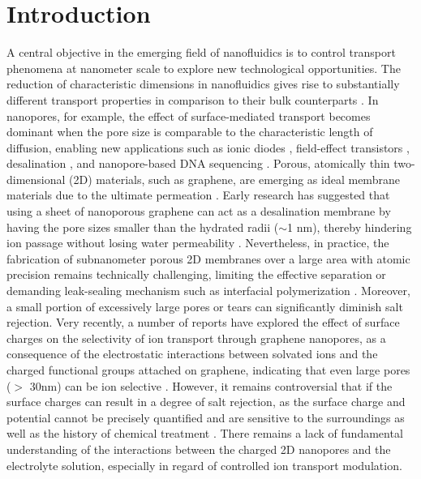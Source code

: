 \documentclass[journal=langd5,email=true, hyperref=true, keywords=false]{achemso}
\begin{document}
\section*{Introduction}
\label{sec:intro}
A central objective in the emerging field of nanofluidics is to
control transport phenomena at nanometer scale to explore new
technological opportunities. The reduction of characteristic
dimensions in nanofluidics gives rise to substantially different
transport properties in comparison to their bulk counterparts
\cite{Schoch_2008}. In nanopores, for example, the effect of
surface-mediated transport becomes dominant when the pore size is
comparable to the characteristic length of diffusion, enabling new
applications such as ionic diodes \cite{Karnik_2007,siwy2002fabrication,vlassiouk2007nanofluidic}, field-effect
transistors \cite{Nam_2009}, desalination \cite{Heiranian_2015}, and
nanopore-based DNA sequencing \cite{Heerema_2016,Garaj_2013}. Porous,
atomically thin two-dimensional (2D) materials, such as graphene, are
emerging as ideal membrane materials due to the ultimate permeation
\cite{Suk_2010,Jiang_2009,Celebi_2014,Koenig_2012,Drahushuk_2012}. Early
research has suggested that using a sheet of nanoporous graphene can
act as a desalination membrane by having the pore sizes smaller than
the hydrated radii ($\sim$1 nm), thereby hindering ion passage without
losing water permeability
\cite{Cohen_Tanugi_2012,Suk_2014,Cohen_Tanugi_2014,Cohen_Tanugi_2015,O_Hern_2014,O_Hern_2015,Surwade_2015,Walker_2017,Ghosh_2018}. Nevertheless,
in practice, the fabrication of subnanometer porous 2D membranes over
a large area with atomic precision remains technically challenging, 
{limiting the effective separation or demanding leak-sealing mechanism such as interfacial polymerization}
\cite{Suk_2014,Rollings_2016,O_Hern_2012,Wang_2017}. Moreover, a small
portion of excessively large pores or tears can significantly diminish
salt rejection.  Very recently, a number of reports have explored the
effect of surface charges on the selectivity of ion transport through
graphene nanopores, as a consequence of the electrostatic interactions
between solvated ions and the charged functional groups attached on
graphene, indicating that even large pores ($>$ 30nm) can be ion
selective \cite{Rollings_2016,Surwade_2014}. However, it remains
controversial that if the surface charges can result in a degree of
salt rejection, as the surface charge and potential cannot be
precisely quantified and are sensitive to the surroundings as well as
the history of chemical treatment \cite{Li_2008}. There remains a lack
of fundamental understanding of the interactions between the charged
2D nanopores and the electrolyte solution, { especially in regard of controlled ion transport modulation}. 
\end{document}
